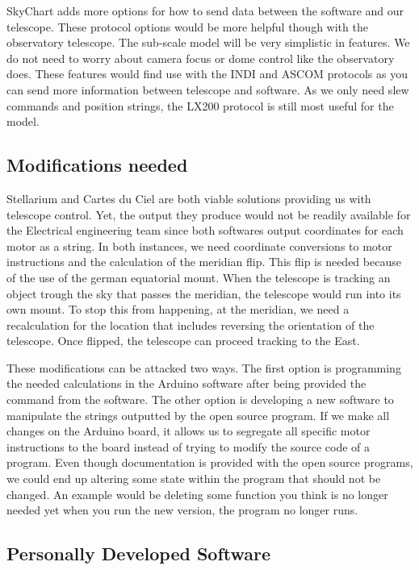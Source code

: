 \documentclass[12pt]{report}
\begin{document}
SkyChart adds more options for how to send data between the software and our telescope. These protocol options would be more helpful though with the observatory telescope. The sub-scale model will be very simplistic in features. We do not need to worry about camera focus or dome control like the observatory does. These features would find use with the INDI and ASCOM protocols as you can send more information between telescope and software. As we only need slew commands and position strings, the LX200 protocol is still most useful for the model.

\subsection*{Modifications needed}

Stellarium and Cartes du Ciel are both viable solutions providing us with telescope control. Yet, the output they produce would not be readily available for the Electrical engineering team since both softwares output coordinates for each motor as a string. In both instances, we need coordinate conversions to motor instructions and the calculation of the meridian flip. This flip is needed because of the use of the german equatorial mount. When the telescope is tracking an object trough the sky that passes the meridian, the telescope would run into its own mount. To stop this from happening, at the meridian, we need a recalculation for the location that includes reversing the orientation of the telescope. Once flipped, the telescope can proceed tracking to the East.

These modifications can be attacked two ways. The first option is programming the needed calculations in the Arduino software after being provided the command from the software. The other option is developing a new software to manipulate the strings outputted by the open source program. If we make all changes on the Arduino board, it allows us to segregate all specific motor instructions to the board instead of trying to modify the source code of a program. Even though documentation is provided with the open source programs, we could end up altering some state within the program that should not be changed. An example would be deleting some function you think is no longer needed yet when you run the new version, the program no longer runs.

\subsection*{Personally Developed Software}
\end{document}
